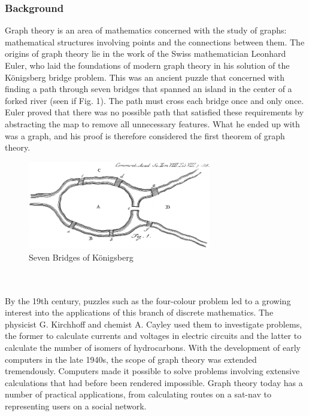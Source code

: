 \documentclass[titlepage]{article}
\begin{document}
\subsubsection{Background}
Graph theory is an area of mathematics concerned with the study of graphs: mathematical structures involving points and the connections between them. The origins of graph theory lie in the work of the Swiss mathematician Leonhard Euler, who laid the foundations of modern graph theory in his solution of the K\"{o}nigsberg bridge problem. This was an ancient puzzle that concerned with finding a path through seven bridges that spanned an island in the center of a forked river (seen if Fig. 1). The path must cross each bridge once and only once. Euler proved that there was no possible path that satisfied these requirements by abstracting the map to remove all unnecessary features. What he ended up with was a graph, and his proof is therefore considered the first theorem of graph theory. \cite{graphhistory}
\begin{figure}[h]
  \centering
  \includegraphics[width=8cm]{bridges.png}
  \caption{Seven Bridges of K\"{o}nigsberg}
  \label{fig:boat1}
\end{figure}
\\\\
By the 19th century, puzzles such as the four-colour problem led to a growing interest into the applications of this branch of discrete mathematics. The physicist G. Kirchhoff and chemist A. Cayley used them to investigate problems, the former to calculate currents and voltages in electric circuits and the latter to calculate the number of isomers of hydrocarbons. With the development of early computers in the late 1940s, the scope of graph theory was extended tremendously. Computers made it possible to solve problems involving extensive calculations that had before been rendered impossible. Graph theory today has a number of practical applications, from calculating routes on a sat-nav to representing users on a social network. \cite{graphcurrent}
\end{document}
